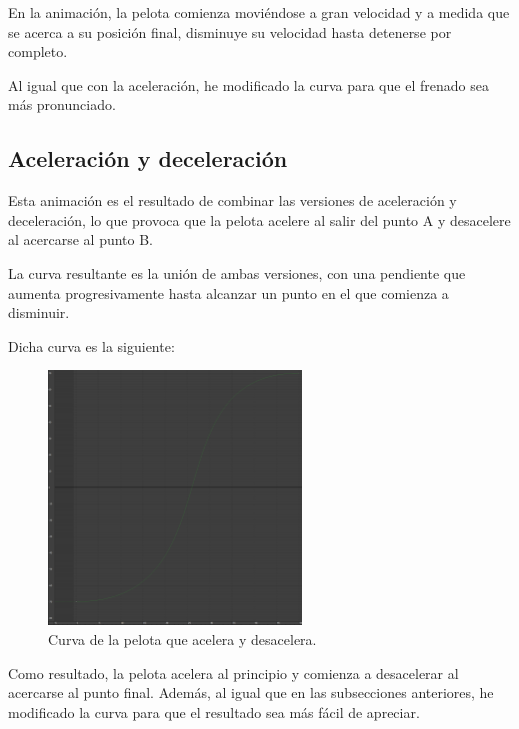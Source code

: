 \documentclass{article}
\begin{document}
En la animación, la pelota comienza moviéndose a gran velocidad y a medida que se acerca a su posición final, disminuye su velocidad hasta detenerse por completo.

\bigskip

Al igual que con la aceleración, he modificado la curva para que el frenado sea más pronunciado.

\newpage

\subsection{Aceleración y deceleración}

Esta animación es el resultado de combinar las versiones de aceleración y deceleración, lo que provoca que la pelota acelere al salir del punto A y desacelere al acercarse al punto B.

\bigskip

La curva resultante es la unión de ambas versiones, con una pendiente que aumenta progresivamente hasta alcanzar un punto en el que comienza a disminuir.

Dicha curva es la siguiente:

\begin{figure}[H]
    \centering
    \includegraphics[width=0.6\textwidth]{imagenes/Ejercicio 1/curvas/aceldecel.png}
    \caption{Curva de la pelota que acelera y desacelera.}
\end{figure}

Como resultado, la pelota acelera al principio y comienza a desacelerar al acercarse al punto final. Además, al igual que en las subsecciones anteriores, he modificado la curva para que el resultado sea más fácil de apreciar.

\newpage
\end{document}
